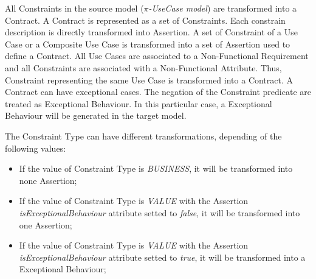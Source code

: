 All {\sc Constraints} in the source model (\textit{$\pi$-UseCase model}) are
transformed into a {\sc Contract}. A {\sc Contract} is represented as a set of {\sc Constraints}. Each
constrain description is directly transformed into {\sc Assertion}. A set of
{\sc Constraint} of a {\sc Use Case} or a {\sc Composite Use Case} is
transformed into a set of {\sc Assertion} used to define a
{\sc Contract}. All {\sc Use Cases} are associated to a {\sc Non-Functional
Requirement} and all {\sc Constraints} are associated with a {\sc Non-Functional Attribute}. Thus,
{\sc Constraint} representing the same {\sc Use Case} is transformed into a
{\sc Contract}. A {\sc Contract} can have exceptional cases. The negation of the
{\sc Constraint} predicate are treated as {\sc Exceptional Behaviour}. In this
particular case, a {\sc Exceptional Behaviour} will be generated in the target
model. 

The {\sc Constraint Type} can have different transformations, depending of the
following values:

\begin{itemize}
\item If the value of {\sc Constraint Type} is \textit{BUSINESS}, it will be
transformed into none {\sc Assertion};
\item If the value of {\sc Constraint Type} is \textit{VALUE} with the
{\sc Assertion} \textit{isExceptionalBehaviour} attribute setted to
\textit{false}, it will be transformed into one {\sc Assertion};
\item If the value of {\sc Constraint Type} is \textit{VALUE} with the
{\sc Assertion} \textit{isExceptionalBehaviour} attribute setted to
\textit{true}, it will be transformed into a {\sc Exceptional Behaviour};
\end{itemize}

